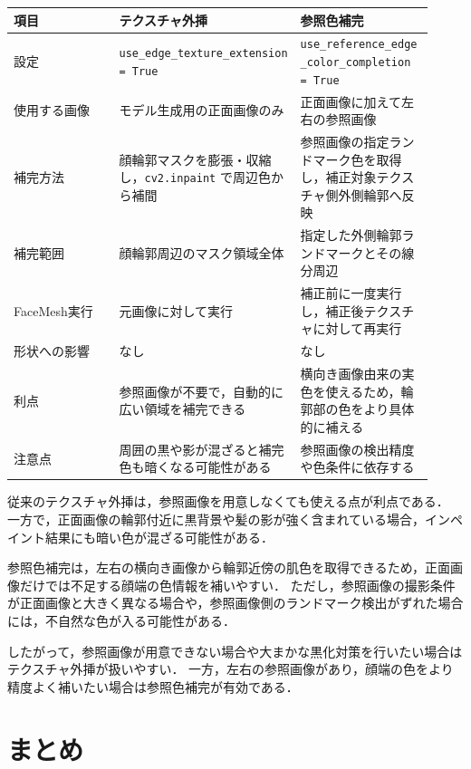 \documentclass[uplatex,dvipdfmx]{jsarticle}
\begin{document}
\begin{table}[h]
\centering
\begin{tabular}{|p{0.28\linewidth}|p{0.32\linewidth}|p{0.32\linewidth}|}
\hline
項目 & テクスチャ外挿 & 参照色補完 \\
\hline
設定 & \shortstack[l]{\texttt{use\_edge\_texture\_extension}\\\texttt{= True}} & \shortstack[l]{\texttt{use\_reference\_edge}\\\texttt{\_color\_completion}\\\texttt{= True}} \\
\hline
使用する画像 & モデル生成用の正面画像のみ & 正面画像に加えて左右の参照画像 \\
\hline
補完方法 & 顔輪郭マスクを膨張・収縮し，\verb|cv2.inpaint| で周辺色から補間 & 参照画像の指定ランドマーク色を取得し，補正対象テクスチャ側外側輪郭へ反映 \\
\hline
補完範囲 & 顔輪郭周辺のマスク領域全体 & 指定した外側輪郭ランドマークとその線分周辺 \\
\hline
FaceMesh実行 & 元画像に対して実行 & 補正前に一度実行し，補正後テクスチャに対して再実行 \\
\hline
形状への影響 & なし & なし \\
\hline
利点 & 参照画像が不要で，自動的に広い領域を補完できる & 横向き画像由来の実色を使えるため，輪郭部の色をより具体的に補える \\
\hline
注意点 & 周囲の黒や影が混ざると補完色も暗くなる可能性がある & 参照画像の検出精度や色条件に依存する \\
\hline
\end{tabular}
\end{table}

従来のテクスチャ外挿は，参照画像を用意しなくても使える点が利点である．
一方で，正面画像の輪郭付近に黒背景や髪の影が強く含まれている場合，インペイント結果にも暗い色が混ざる可能性がある．

参照色補完は，左右の横向き画像から輪郭近傍の肌色を取得できるため，正面画像だけでは不足する顔端の色情報を補いやすい．
ただし，参照画像の撮影条件が正面画像と大きく異なる場合や，参照画像側のランドマーク検出がずれた場合には，不自然な色が入る可能性がある．

したがって，参照画像が用意できない場合や大まかな黒化対策を行いたい場合はテクスチャ外挿が扱いやすい．
一方，左右の参照画像があり，顔端の色をより精度よく補いたい場合は参照色補完が有効である．

\section{まとめ}
\end{document}
